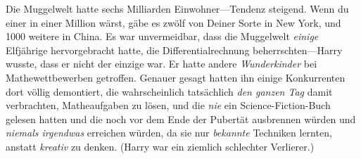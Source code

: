 Die Muggelwelt hatte sechs Milliarden Einwohner—Tendenz steigend. Wenn du einer in einer Million wärst, gäbe es zwölf von Deiner Sorte in New York, und 1000 weitere in China. Es war unvermeidbar, dass die Muggelwelt \emph{einige} Elfjährige hervorgebracht hatte, die Differentialrechnung beherrschten—Harry wusste, dass er nicht der einzige war. Er hatte andere \emph{Wunderkinder} bei Mathewettbewerben getroffen. Genauer gesagt hatten ihn einige Konkurrenten dort völlig demontiert, die wahrscheinlich tatsächlich \emph{den ganzen Tag} damit verbrachten, Matheaufgaben zu lösen, und die \emph{nie} ein Science-Fiction-Buch gelesen hatten und die noch vor dem Ende der Pubertät ausbrennen würden und \emph{niemals irgendwas} erreichen würden, da sie nur \emph{bekannte} Techniken lernten, anstatt \emph{kreativ} zu denken. (Harry war ein ziemlich schlechter Verlierer.)

